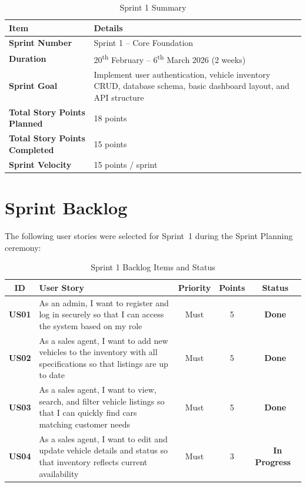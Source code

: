 \documentclass[12pt,a4paper]{article}
\newcommand{\thead}[1]{\textbf{\color{white}#1}}
\newcommand{\done}{\colorbox{GreenBg}{\color{GreenText}\small\textbf{~Done~}}}
\newcommand{\inprogress}{\colorbox{YellowBg}{\color{YellowText}\small\textbf{~In Progress~}}}
\begin{document}
\begin{table}[H]
\centering
\renewcommand{\arraystretch}{1.4}
\begin{tabularx}{\textwidth}{|l|Y|}
\hline
{} \thead{Item} & \thead{Details} \\
\hline
\textbf{Sprint Number}    & Sprint 1 -- Core Foundation \\
\hline
{}
\textbf{Duration}          & 20\textsuperscript{th} February -- 6\textsuperscript{th} March 2026 (2 weeks) \\
\hline
\textbf{Sprint Goal}       & Implement user authentication, vehicle inventory CRUD, database schema, basic dashboard layout, and API structure \\
\hline
{}
\textbf{Total Story Points Planned} & 18 points \\
\hline
\textbf{Total Story Points Completed} & 15 points \\
\hline
{}
\textbf{Sprint Velocity}   & 15 points / sprint \\
\hline
\end{tabularx}
\caption{Sprint 1 Summary}
\end{table}


\section{Sprint Backlog}

The following user stories were selected for Sprint~1 during the Sprint Planning ceremony:

\begin{table}[H]
\centering
\renewcommand{\arraystretch}{1.3}
\footnotesize
\begin{tabularx}{\textwidth}{|c|Y|c|c|c|}
\hline
{} \thead{ID} & \thead{User Story} & \thead{Priority} & \thead{Points} & \thead{Status} \\
\hline
\textbf{US01} & As an admin, I want to register and log in securely so that I can access the system based on my role & Must & 5 & \done \\
\hline
{}
\textbf{US02} & As a sales agent, I want to add new vehicles to the inventory with all specifications so that listings are up to date & Must & 5 & \done \\
\hline
\textbf{US03} & As a sales agent, I want to view, search, and filter vehicle listings so that I can quickly find cars matching customer needs & Must & 5 & \done \\
\hline
{}
\textbf{US04} & As a sales agent, I want to edit and update vehicle details and status so that inventory reflects current availability & Must & 3 & \inprogress \\
\hline
\end{tabularx}
\caption{Sprint 1 Backlog Items and Status}
\end{table}
\end{document}

